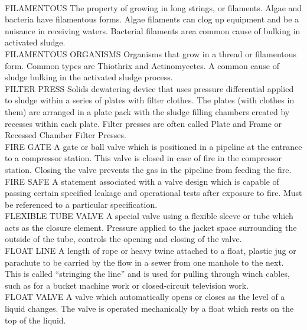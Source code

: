 \documentclass{article}
\begin{document}
\vspace{0.3cm}\\
FILAMENTOUS
The property of growing in long strings, or filaments. Algae and bacteria have filamentous forms. Algae filaments can clog up equipment and be a nuisance in receiving waters. Bacterial filaments area common cause of bulking in activated sludge.
\vspace{0.3cm}\\
FILAMENTOUS ORGANISMS
Organisms that grow in a thread or filamentous form. Common types are Thiothrix and Actinomycetes. A common cause of sludge bulking in the activated sludge process.
\vspace{0.3cm}\\
FILTER PRESS
Solids dewatering device that uses pressure differential applied to sludge within a series of plates with filter clothes. The plates (with clothes in them) are arranged in a plate pack with the sludge filling chambers created by recesses within each plate. Filter presses are often called Plate and Frame or Recessed Chamber Filter Presses.
\vspace{0.3cm}\\
FIRE GATE
A gate or ball valve which is positioned in a pipeline at the entrance to a compressor station. This valve is closed in case of fire in the compressor station. Closing the valve prevents the gas in the pipeline from feeding the fire.
\vspace{0.3cm}\\
FIRE SAFE
A statement associated with a valve design which is capable of passing certain specified leakage and operational tests after exposure to fire. Must be referenced to a particular specification.
\vspace{0.3cm}\\
FLEXIBLE TUBE VALVE
A special valve using a flexible sleeve or tube which acts as the closure element. Pressure applied to the jacket space surrounding the outside of the tube, controls the opening and closing of the valve.
\vspace{0.3cm}\\
FLOAT LINE
A length of rope or heavy twine attached to a float, plastic jug or parachute to be carried by the flow in a sewer from one manhole to the next. This is called “stringing the line” and is used for pulling through winch cables, such as for a bucket machine work or closed-circuit television work. 
\vspace{0.3cm}\\
FLOAT VALVE
A valve which automatically opens or closes as the level of a liquid changes. The valve is operated mechanically by a float which rests on the top of the liquid.
\end{document}
